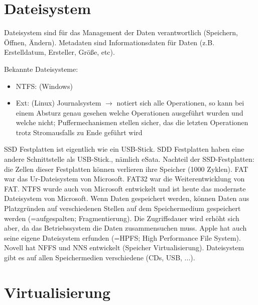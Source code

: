 \documentclass[a4paper]{report}
\begin{document}
\chapter{Dateisystem}

Dateisystem sind für das Management der Daten verantwortlich (Speichern, Öffnen, Ändern). Metadaten sind Informationsdaten für Daten (z.B. Erstelldatum, Ersteller, Größe, etc).


Bekannte Dateisysteme:

\begin{itemize}
\item NTFS: (Windows)
\item Ext: (Linux) Journalsystem $\rightarrow$ notiert sich alle Operationen, so kann bei einem Absturz genau gesehen welche Operationen ausgeführt wurden und welche nicht; Puffermechanismen stellen sicher, das die letzten Operationen trotz Stromausfalls zu Ende geführt wird
\end{itemize}

SSD Festplatten ist eigentlich wie ein USB-Stick. SDD Festplatten haben eine andere Schnittstelle als USB-Stick., nämlich eSata.
\newline
\newline
Nachteil der SSD-Festplatten: die Zellen dieser Festplatten können verlieren ihre Speicher (1000 Zyklen).
\newline
\newline
FAT war das Ur-Dateisystem von Microsoft. FAT32 war die Weiterentwicklung von FAT. NTFS wurde auch von Microsoft entwickelt und ist heute das modernste Dateisystem von Microsoft.
\newline
\newline
Wenn Daten gespeichert werden, können Daten aus Platzgründen auf verschiedenen Stellen auf dem Speichermedium gespeichert werden (=aufgespalten; Fragmentierung). Die Zugriffsdauer wird erhöht sich aber, da das Betriebssystem die Daten zusammensuchen muss.
\newline
\newline
Apple hat auch seine eigene Dateisystem erfunden (=HPFS; High Performance File System).
\newline
\newline
Novell hat NFFS und NNS entwickelt (Speicher Virtualisierung).
\newline
\newline
Dateisystem gibt es auf allen Speichermedien verschiedene (CDs, USB, ...).

\chapter{Virtualisierung}
\end{document}
